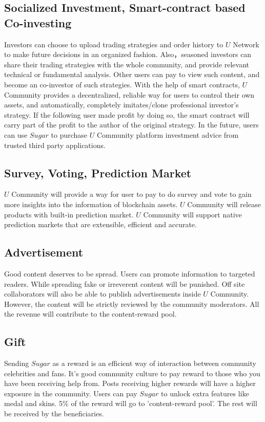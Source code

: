 \subsection{Socialized Investment, Smart-contract based Co-investing}
Investors can choose to upload trading strategies and order history to $U$ Network to make future decisions in an organized fashion. Also，seasoned investors can share their trading strategies with the whole community, and provide relevant technical or fundamental analysis. Other users can pay to view such content, and become an co-investor of such strategies. With the help of smart contracts, $U$ Community provides a decentralized, reliable way for users to control their own assets, and automatically, completely imitates/clone professional investor's strategy. If the following user made profit by doing so, the smart contract will carry part of the profit to the author of the original strategy. 
In the future, users can use $Sugar$ to purchase $U$ Community platform investment advice from trusted third party applications. 
\subsection{Survey, Voting, Prediction Market}
$U$ Community will provide a way for user to pay to do survey and vote to gain more insights into the information of blockchain assets. $U$ Community will release products with built-in prediction market. $U$ Community will support native prediction markets that are extensible, efficient and accurate.
\subsection{Advertisement}
Good content deserves to be spread. Users can promote information to targeted readers. While spreading fake or irreverent content will be punished.  
Off site collaborators will also be able to publish advertisements inside $U$ Community. However, the content will be strictly reviewed by the community moderators. All the revenue will contribute to the content-reward pool. 
\subsection{Gift}
Sending $Sugar$ as a reward is an efficient way of interaction between community celebrities and fans. It's good community culture to pay reward to those who you have been receiving help from. Posts receiving higher rewards will have a higher exposure in the community. Users can pay $Sugar$ to unlock extra features like medal and skins. 5\% of the reward will go to 'content-reward pool'. The rest will be received by the beneficiaries. 
